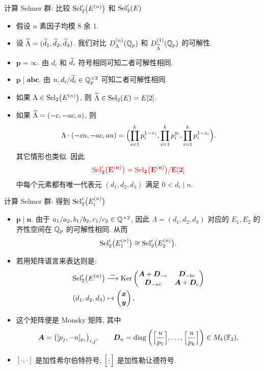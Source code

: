\documentclass[aspectratio=169,handout]{ctexbeamer}
\begin{document}
\begin{frame}{计算 Selmer 群: 比较 ${\mathrm{Sel}}_2'\bigl(E^{(n)}\bigr)$ 和 ${\mathrm{Sel}}_2'(E)$}
\begin{itemize}
\item 假设 $n$ 素因子均模 $8$ 余 $1$.
\item 设 $\widetilde\Lambda=(\widetilde d_1,\widetilde d_2,\widetilde d_3)$.
我们对比 $D_\Lambda^{(n)}({\mathbb{Q}}_p)$ 和 $D_{\widetilde\Lambda}^{(1)}({\mathbb{Q}}_p)$ 的可解性.
\item \alert{$\bm{p=\infty}$}. 由 $d_i$ 和 $\widetilde d_i$ 符号相同可知二者可解性相同.
\item \alert{$\bm{p\mid abc}$}. 由 $n,d_i/\widetilde d_i\in{\mathbb{Q}}_p^{\times2}$ 可知二者可解性相同.
\item 如果 $\Lambda\in{\mathrm{Sel}}_2\bigl(E^{(n)}\bigr)$, 则 $\widetilde\Lambda\in {\mathrm{Sel}}_2(E)=E[2]$.
\item 如果 $\widetilde\Lambda=(-c,-ac,a)$, 则
\[\Lambda\cdot(-cn,-ac,an)=\Bigl(\prod_{i=1}^k p_i^{1-x_i},\prod_{i=1}^k p_i^{y_i},\prod_{i=1}^k p_i^{1-z_i}\Bigr).\]
其它情形也类似.
\onslide<+-> 
因此
\[\alert{\Sel_2'\bigl(E^{(n)}\bigr)=\Sel_2\bigl(E^{(n)}\bigr)/E[2]}\]
\alert{中每个元素都有唯一代表元 $(d_1,d_2,d_3)$ 满足 $0<d_i\mid n$}.
\end{itemize}
\end{frame}


\begin{frame}{计算 Selmer 群: 得到 ${\mathrm{Sel}}_2'\bigl(E_i^{(n)}\bigr)$}
\begin{itemize}
\item \alert{$\bm{p\mid n}$}.
\onslide<+-> 
由于 $a_1/a_2,b_1/b_2,c_1/c_2\in {\mathbb{Q}}^{\times2}$, 因此 $\Lambda=(d_1,d_2,d_3)$ 对应的 $E_1,E_2$ 的齐性空间在 ${\mathbb{Q}}_p$ 的可解性相同.
\onslide<+-> 
从而
\[{\mathrm{Sel}}_2'\bigl(E_1^{(n)}\bigr)\cong {\mathrm{Sel}}_2'\bigl(E_2^{(n)}\bigr).\]
\item 若用矩阵语言来表达则是:
\[\begin{split}
{\mathrm{Sel}}_2'\bigl(E^{(n)}\bigr)&\stackrel{\sim}{\longrightarrow} \operatorname{Ker}\begin{pmatrix}
{\boldsymbol{A}}+{\boldsymbol{D}}_{-c}&{\boldsymbol{D}}_{-bc}\\{\boldsymbol{D}}_{-ac}&{\boldsymbol{A}}+{\boldsymbol{D}}_c
\end{pmatrix}\\
(d_1,d_2,d_3)&\mapsto \begin{pmatrix}
  {\boldsymbol{x}}\\{\boldsymbol{y}}
\end{pmatrix},\end{split}\]
\item 这个矩阵便是 Monsky 矩阵, 其中
\[{\boldsymbol{A}}=\bigl([p_j,-n]_{p_i}\bigr)_{i,j},\qquad
{\boldsymbol{D}}_u={\mathrm{diag}}\left(\Bigl[\frac{{u}}{p_1}\Bigr],\dots,\Bigl[\frac{{u}}{p_k}\Bigr]\right)\in M_k({\mathbb{F}}_2),\]
\vspace{-\baselineskip}
\item $[\cdot,\cdot]$ 是加性希尔伯特符号, $\Bigl[\frac{{\cdot}}{\cdot}\Bigr]$ 是加性勒让德符号.
\end{itemize}
\end{frame}
\end{document}
